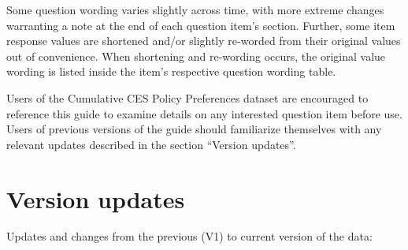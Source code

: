 \documentclass[
  12pt]{article}
\begin{document}
\medskip

Some question wording varies slightly across time, with more extreme
changes warranting a note at the end of each question item's section.
Further, some item response values are shortened and/or slightly
re-worded from their original values out of convenience. When shortening
and re-wording occurs, the original value wording is listed inside the
item's respective question wording table.

\medskip

Users of the Cumulative CES Policy Preferences dataset are encouraged to
reference this guide to examine details on any interested question item
before use. Users of previous versions of the guide should familiarize
themselves with any relevant updates described in the section ``Version
updates''.

\hypertarget{version-updates}{%
\section{Version updates}\label{version-updates}}

Updates and changes from the previous (V1) to current version of the
data:
\end{document}
